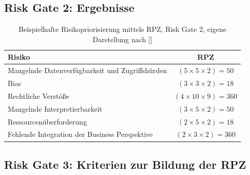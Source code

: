 \subsection{Risk Gate 2: Ergebnisse}

\begin{table}[H]
\centering
\begin{tabular}{|p{9cm}|c|}
\hline
\textbf{Risiko} & \textbf{RPZ} \\ \hline
Mangelnde Datenverfügbarkeit und Zugriffshürden & $(5 \times 5 \times 2) = 50$ \\ \hline
Bias & $(3 \times 3 \times 2) = 18$ \\ \hline
Rechtliche Verstöße & $(4 \times 10 \times 9) = 360$ \\ \hline
Mangelnde Interpretierbarkeit & $(3 \times 5 \times 2) = 50$ \\ \hline
Ressourcenüberforderung & $(2 \times 5 \times 2) = 18$ \\ \hline
Fehlende Integration der Business Perspektive & $(2 \times 3 \times 2) = 360$ \\ \hline
\end{tabular}
\caption{Beispielhafte Risikopriorisierung mittels RPZ, Risk Gate 2, eigene Darstellung nach []}
\label{tab:rpz_risiken}
\end{table}

\subsection{Risk Gate 3: Kriterien zur Bildung der RPZ}

